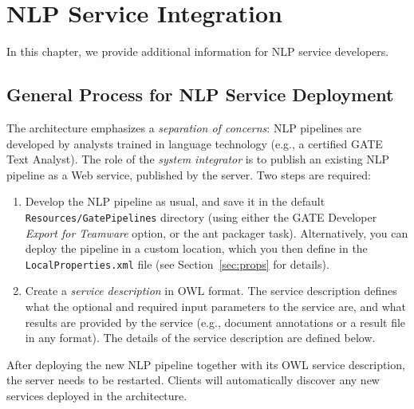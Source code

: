 
\chapter{NLP Service Integration}
\label{chap:services}
In this chapter, we provide additional information for NLP service developers. 

\section{General Process for NLP Service Deployment}
The \sa architecture emphasizes a \emph{separation of concerns}: NLP
pipelines are developed by analysts trained in language technology
(e.g., a certified GATE Text Analyst). The role of the \emph{system
  integrator} is to publish an existing NLP pipeline as a Web
service, published by the \sa server. Two steps are required:
\begin{enumerate}
\item Develop the NLP pipeline as usual, and save it in the default
  \texttt{Resources/GatePipelines} directory (using either the GATE
  Developer \emph{Export for Teamware} option, or the ant packager
  task). Alternatively, you can deploy the pipeline in a custom
  location, which you then define in the \texttt{LocalProperties.xml}
  file (see Section~\ref{sec:props} for details).
\item Create a \emph{service description} in OWL format. The service
  description defines what the optional and required input parameters to the  
  service are, and what results are provided by the service (e.g.,
  document annotations or a result file in any format). The details
  of the \sa service description are defined below.
\end{enumerate}
After deploying the new NLP pipeline together with its OWL service
description, the \sa server needs to be restarted. Clients will
automatically discover any new services deployed in the architecture.

